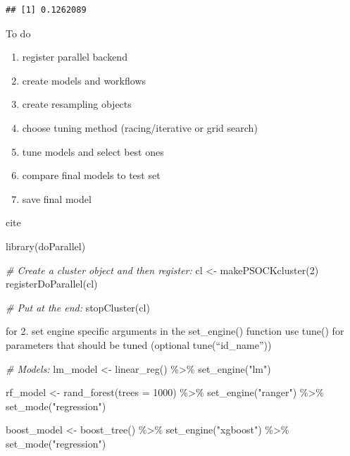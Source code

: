 \documentclass[
]{book}
\newenvironment{Shaded}{\begin{snugshade}}{\end{snugshade}}
\newcommand{\AttributeTok}[1]{\textcolor[rgb]{0.77,0.63,0.00}{#1}}
\newcommand{\CommentTok}[1]{\textcolor[rgb]{0.56,0.35,0.01}{\textit{#1}}}
\newcommand{\DecValTok}[1]{\textcolor[rgb]{0.00,0.00,0.81}{#1}}
\newcommand{\FunctionTok}[1]{\textcolor[rgb]{0.00,0.00,0.00}{#1}}
\newcommand{\NormalTok}[1]{#1}
\newcommand{\OtherTok}[1]{\textcolor[rgb]{0.56,0.35,0.01}{#1}}
\newcommand{\SpecialCharTok}[1]{\textcolor[rgb]{0.00,0.00,0.00}{#1}}
\newcommand{\StringTok}[1]{\textcolor[rgb]{0.31,0.60,0.02}{#1}}
\begin{document}
\begin{verbatim}
## [1] 0.1262089
\end{verbatim}

To do

\begin{enumerate}
\def\labelenumi{\arabic{enumi}.}
\item
  register parallel backend
\item
  create models and workflows
\item
  create resampling objects
\item
  choose tuning method (racing/iterative or grid search)
\item
  tune models and select best ones
\item
  compare final models to test set
\item
  save final model
\end{enumerate}

cite \citep{doParallel_package}

\begin{Shaded}
\begin{Highlighting}[]
\FunctionTok{library}\NormalTok{(doParallel)}

\CommentTok{\# Create a cluster object and then register: }
\NormalTok{cl }\OtherTok{\textless{}{-}} \FunctionTok{makePSOCKcluster}\NormalTok{(}\DecValTok{2}\NormalTok{)}
\FunctionTok{registerDoParallel}\NormalTok{(cl)}

\CommentTok{\# Put at the end:}
\FunctionTok{stopCluster}\NormalTok{(cl)}
\end{Highlighting}
\end{Shaded}

for 2. set engine specific arguments in the set\_engine() function use tune() for parameters that should be tuned (optional tune(``id\_name''))

\begin{Shaded}
\begin{Highlighting}[]
\CommentTok{\# Models:}
\NormalTok{lm\_model }\OtherTok{\textless{}{-}} \FunctionTok{linear\_reg}\NormalTok{() }\SpecialCharTok{\%\textgreater{}\%} 
  \FunctionTok{set\_engine}\NormalTok{(}\StringTok{"lm"}\NormalTok{)}

\NormalTok{rf\_model }\OtherTok{\textless{}{-}} \FunctionTok{rand\_forest}\NormalTok{(}\AttributeTok{trees =} \DecValTok{1000}\NormalTok{) }\SpecialCharTok{\%\textgreater{}\%} 
  \FunctionTok{set\_engine}\NormalTok{(}\StringTok{"ranger"}\NormalTok{) }\SpecialCharTok{\%\textgreater{}\%} 
  \FunctionTok{set\_mode}\NormalTok{(}\StringTok{"regression"}\NormalTok{)}

\NormalTok{boost\_model }\OtherTok{\textless{}{-}} \FunctionTok{boost\_tree}\NormalTok{() }\SpecialCharTok{\%\textgreater{}\%}
  \FunctionTok{set\_engine}\NormalTok{(}\StringTok{"xgboost"}\NormalTok{) }\SpecialCharTok{\%\textgreater{}\%} 
  \FunctionTok{set\_mode}\NormalTok{(}\StringTok{"regression"}\NormalTok{)}
\end{Highlighting}
\end{Shaded}
\end{document}
